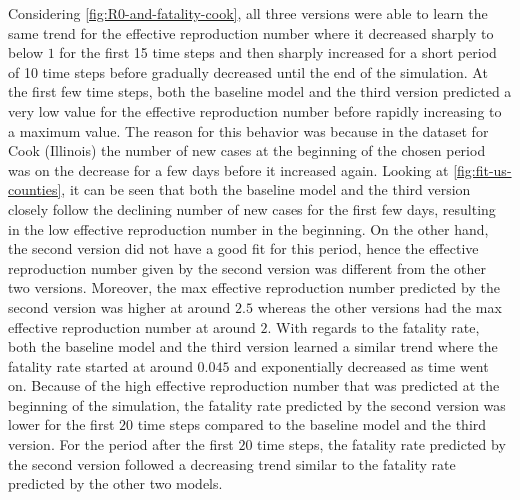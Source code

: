 Considering \autoref{fig:R0-and-fatality-cook}, all three versions were able to learn the same trend for the effective reproduction number where it decreased sharply to below $1$ for the first 15 time steps and then sharply increased for a short period of 10 time steps before gradually decreased until the end of the simulation.
At the first few time steps, both the baseline model and the third version predicted a very low value for the effective reproduction number before rapidly increasing to a maximum value.
The reason for this behavior was because in the dataset for Cook (Illinois) the number of new cases at the beginning of the chosen period was on the decrease for a few days before it increased again.
Looking at \autoref{fig:fit-us-counties}, it can be seen that both the baseline model and the third version closely follow the declining number of new cases for the first few days, resulting in the low effective reproduction number in the beginning.
On the other hand, the second version did not have a good fit for this period, hence the effective reproduction number given by the second version was different from the other two versions.
Moreover, the max effective reproduction number predicted by the second version was higher at around $2.5$ whereas the other versions had the max effective reproduction number at around $2$.
With regards to the fatality rate, both the baseline model and the third version learned a similar trend where the fatality rate started at around $0.045$ and exponentially decreased as time went on.
Because of the high effective reproduction number that was predicted at the beginning of the simulation, the fatality rate predicted by the second version was lower for the first $20$ time steps compared to the baseline model and the third version.
For the period after the first $20$ time steps, the fatality rate predicted by the second version followed a decreasing trend similar to the fatality rate predicted by the other two models.

